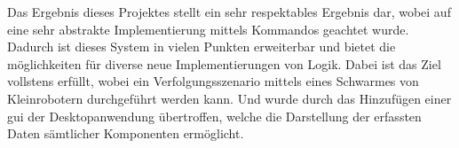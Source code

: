 \noindent
Das Ergebnis dieses Projektes stellt ein sehr respektables Ergebnis dar, wobei auf eine sehr abstrakte Implementierung mittels Kommandos geachtet wurde. Dadurch ist dieses System in vielen Punkten erweiterbar und bietet die möglichkeiten für diverse neue Implementierungen von Logik. Dabei ist das Ziel vollstens erfüllt, wobei ein Verfolgungsszenario mittels eines Schwarmes von Kleinrobotern durchgeführt werden kann. Und wurde durch das Hinzufügen einer \gls{gui} der Desktopanwendung übertroffen, welche die Darstellung der erfassten Daten sämtlicher Komponenten ermöglicht.